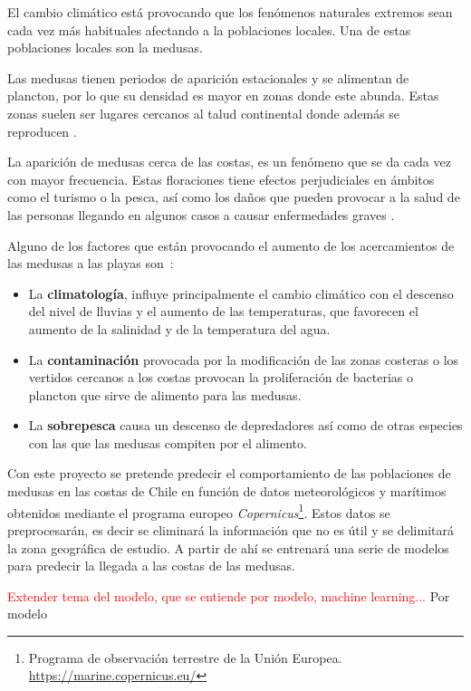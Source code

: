 
\begin{comment}
Descripción del contenido del trabajo y del estrucutra de la memoria y del resto de materiales entregados.
\end{comment}

El cambio climático está provocando que los fenómenos naturales extremos sean cada vez más habituales afectando a la poblaciones locales. Una de estas poblaciones locales son la medusas.

Las medusas tienen periodos de aparición estacionales y se alimentan de plancton, por lo que su densidad es mayor en zonas donde este abunda. Estas zonas suelen ser lugares cercanos al talud continental donde además se reproducen \cite{noauthor_proliferaciones_nodate}. %

La aparición de medusas cerca de las costas, es un fenómeno que se da cada vez con mayor frecuencia. Estas floraciones tiene efectos perjudiciales en ámbitos como el turismo o la pesca, así como los daños que pueden provocar a la salud de las personas llegando en algunos casos a causar enfermedades graves \cite{art:picaduras_1,art:picaduras_2}. 

Alguno de los factores que están provocando el aumento de los acercamientos de las medusas a las playas son~\cite{noauthor_proliferaciones_nodate,art:ArticuloCanepa_1}:
\begin{itemize}
	\item La \textbf{climatología}, influye principalmente el cambio climático con el descenso del nivel de lluvias y el aumento de las temperaturas, que favorecen el aumento de la salinidad y de la temperatura del agua. 
	\item La \textbf{contaminación} provocada por la modificación de las zonas costeras o los vertidos cercanos a los costas provocan la proliferación de bacterias o plancton que sirve de alimento para las medusas.
	\item La \textbf{sobrepesca} causa un descenso de depredadores así como de otras especies con las que las medusas compiten por el alimento.
\end{itemize}

Con este proyecto se pretende predecir el comportamiento de las poblaciones de medusas en las costas de Chile en función de datos meteorológicos y marítimos obtenidos mediante el programa europeo \emph{Copernicus}\footnote{Programa de observación terrestre de la Unión Europea. \url{https://marine.copernicus.eu/}}. Estos datos se preprocesarán, es decir se eliminará la información que no es útil y se delimitará la zona geográfica de estudio. A partir de ahí se entrenará una serie de modelos para predecir la llegada a las costas de las medusas.

\textcolor{red}{Extender tema del modelo, que se entiende por modelo, machine learning...}
Por modelo